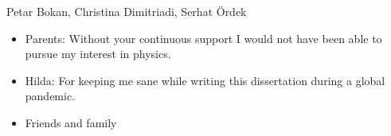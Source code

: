 Petar Bokan, Christina Dimitriadi, Serhat Ördek


\begin{itemize}

\item Parents: Without your continuous support I would not have been able to
  pursue my interest in physics.

\item Hilda: For keeping me sane while writing this dissertation during a global
  pandemic.

\item Friends and family

\end{itemize}


